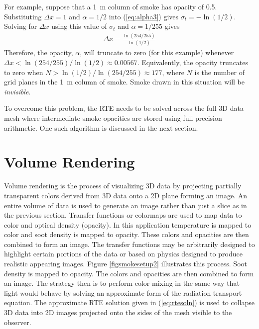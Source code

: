 {For example, suppose that a 1~m column of smoke has opacity of 0.5.  Substituting $\Delta x=1$ and $\alpha=1/2$ into (\ref{eq:alpha3}) gives $\sigma_t=-\ln(1/2)$.  Solving for $\Delta x$ using this value of $\sigma_t$ and $\alpha=1/255$ gives
\begin{eqnarray}
\Delta x = \frac{\ln(254/255)}{\ln(1/2)}
\end{eqnarray}
Therefore, the opacity, $\alpha$, will truncate to zero (for this example) whenever $\Delta x<\ln(254/255)/\ln(1/2)\approx 0.00567$.  Equivalently, the opacity truncates to zero when $N>\ln(1/2)/\ln(254/255)\approx 177$, where $N$ is the number of grid planes in the 1~m column of smoke.  Smoke drawn in this situation will be {\em invisible}.

To overcome this problem, the RTE needs to be solved across the full 3D data mesh where intermediate smoke opacities are stored using full precision arithmetic.  One such algorithm is discussed in the next section.


\section{Volume Rendering}
Volume rendering is the process of visualizing 3D data by projecting partially transparent colors derived from 3D data onto a 2D plane forming an image.  An entire volume of data is used to generate an image rather than just a slice as in the previous section.  Transfer functions or colormaps are used to map data to color and optical density (opacity).  In this application temperature is mapped to color and soot density is mapped to opacity.  These colors and opacities are then combined to form an image.  The transfer functions may be arbitrarily designed to highlight certain portions of the data or based on physics designed to produce realistic appearing images.  Figure \ref{figsmokesetup2} illustrates this process.
Soot density is mapped to opacity.  The colors and opacities are then combined to form an image.  The strategy then is to perform color mixing in the same way that light would behave by solving an approximate form of the radiation transport equation.  The approximate RTE solution given in (\ref{eq:rtesoln})  is used to collapse 3D data into 2D images projected onto the sides of the mesh visible to the observer.

}
